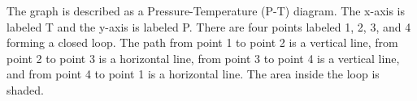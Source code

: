 The graph is described as a Pressure-Temperature (P-T) diagram. The x-axis is labeled T and the y-axis is labeled P. There are four points labeled 1, 2, 3, and 4 forming a closed loop. The path from point 1 to point 2 is a vertical line, from point 2 to point 3 is a horizontal line, from point 3 to point 4 is a vertical line, and from point 4 to point 1 is a horizontal line. The area inside the loop is shaded.